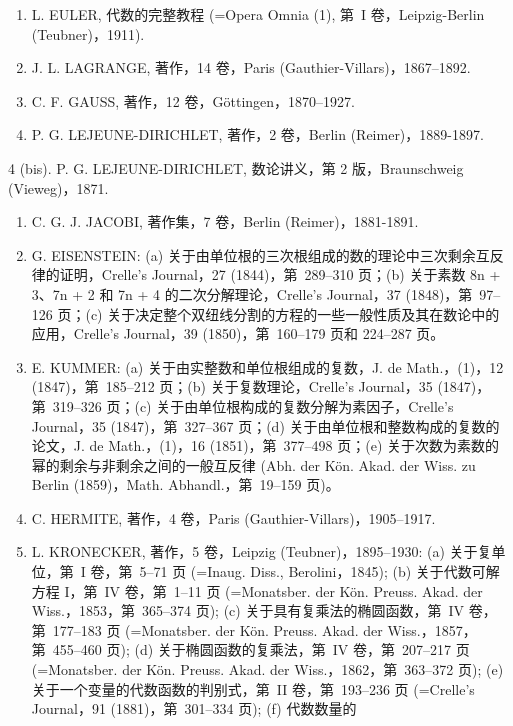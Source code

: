 
\begin{enumerate}
\def\labelenumi{\arabic{enumi}.}
\item
  L. EULER, 代数的完整教程 (=Opera Omnia (1), 第~I 卷，Leipzig-Berlin (Teubner)，1911).
\item
  J. L. LAGRANGE, 著作，14 卷，Paris (Gauthier-Villars)，1867--1892.
\item
  C. F. GAUSS, 著作，12 卷，Göttingen，1870--1927.
\item
  P. G. LEJEUNE-DIRICHLET, 著作，2 卷，Berlin (Reimer)，1889-1897.
\end{enumerate}

4 (bis). P. G. LEJEUNE-DIRICHLET, 数论讲义，第 2 版，Braunschweig (Vieweg)，1871.

\begin{enumerate}
\def\labelenumi{\arabic{enumi}.}
\setcounter{enumi}{4}
\item
  C. G. J. JACOBI, 著作集，7 卷，Berlin (Reimer)，1881-1891.
\item
  G. EISENSTEIN: (a) 关于由单位根的三次根组成的数的理论中三次剩余互反律的证明，Crelle's Journal，27 (1844)，第~289--310 页；(b) 关于素数 8n + 3、7n + 2 和 7n + 4 的二次分解理论，Crelle's Journal，37 (1848)，第~97--126 页；(c) 关于决定整个双纽线分割的方程的一些一般性质及其在数论中的应用，Crelle's Journal，39 (1850)，第~160--179 页和 224--287 页。
\item
  E. KUMMER: (a) 关于由实整数和单位根组成的复数，J. de Math.，(1)，12 (1847)，第~185--212 页；(b) 关于复数理论，Crelle's Journal，35 (1847)，第~319--326 页；(c) 关于由单位根构成的复数分解为素因子，Crelle's Journal，35 (1847)，第~327--367 页；(d) 关于由单位根和整数构成的复数的论文，J. de Math.，(1)，16 (1851)，第~377--498 页；(e) 关于次数为素数的幂的剩余与非剩余之间的一般互反律 (Abh. der Kön. Akad. der Wiss. zu Berlin (1859)，Math. Abhandl.，第~19--159 页)。
\item
  C. HERMITE, 著作，4 卷，Paris (Gauthier-Villars)，1905--1917.
\item
  L. KRONECKER, 著作，5 卷，Leipzig (Teubner)，1895--1930: (a) 关于复单位，第~I 卷，第~5--71 页 (=Inaug. Diss., Berolini，1845); (b) 关于代数可解方程 I，第~IV 卷，第~1--11 页 (=Monatsber. der Kön. Preuss. Akad. der Wiss.，1853，第~365--374 页); (c) 关于具有复乘法的椭圆函数，第~IV 卷，第~177--183 页 (=Monatsber. der Kön. Preuss. Akad. der Wiss.，1857，第~455--460 页); (d) 关于椭圆函数的复乘法，第~IV 卷，第~207--217 页 (=Monatsber. der Kön. Preuss. Akad. der Wiss.，1862，第~363--372 页); (e) 关于一个变量的代数函数的判别式，第~II 卷，第~193--236 页 (=Crelle's Journal，91 (1881)，第~301--334 页); (f) 代数数量的
\end{enumerate}

